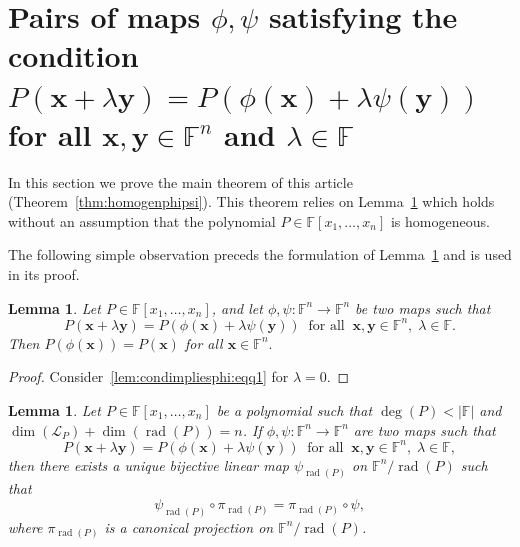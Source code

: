\documentclass{elsarticle}
\DeclareMathOperator{\rad}{rad}
\def\F{{\mathbb F}}
\newtheorem{lemma}[theorem]{Lemma}
\theoremstyle{definition}
\numberwithin{equation}{section}
\begin{document}
\section{Pairs of maps $\phi, \psi$ satisfying the condition $P(\mathbf{x} + \lambda \mathbf{y}) = P(\phi(\mathbf{x}) + \lambda \psi(\mathbf{y}))$ for all $\mathbf{x},\mathbf{y} \in \mathbb F^n$ and $\lambda \in \F$}
\label{sec:factspres}

%
%
In this section we prove the main theorem of this article (Theorem~\ref{thm:homogenphipsi}). This theorem relies on Lemma~\ref{lem:PPhiPsi} which holds without an assumption that the polynomial $P \in \F[x_1,\ldots, x_n]$ is homogeneous. 

The following simple observation preceds the formulation of Lemma~\ref{lem:PPhiPsi} and is used in its  proof.

\begin{lemma}\label{lem:condimpliesphi}Let $P \in \F[x_1,\ldots, x_n]$, and let $\phi, \psi \colon \F^n \to \F^n$ be two maps such that
\begin{equation}\label{lem:condimpliesphi:eqq1}
P(\mathbf{x} + \lambda \mathbf{y}) = P(\phi(\mathbf{x}) + \lambda \psi(\mathbf{y}))\;\;\mbox{for all}\;\;\mathbf{x},\mathbf{y} \in \mathbb \F^n,\; \lambda \in \F.
\end{equation}
Then $P(\phi(\mathbf x)) = P (\mathbf x)$ for all $\mathbf x \in \F^n.$
\end{lemma}
\begin{proof}Consider~\eqref{lem:condimpliesphi:eqq1} for $\lambda = 0.$
\end{proof}


\begin{lemma}\label{lem:PPhiPsi}Let $P \in \F[x_1,\ldots, x_n]$ be a polynomial such that $\deg (P) < |\F|$ and $\dim (\mathcal L_P) + \dim (\rad(P)) = n$.  If  $\phi, \psi \colon \F^n \to \F^n$ are two maps such that
\begin{equation}\label{lem:PPhiPsi:eqq1}
P(\mathbf{x} + \lambda \mathbf{y}) = P(\phi(\mathbf{x}) + \lambda \psi(\mathbf{y}))\;\;\mbox{for all}\;\;\mathbf{x},\mathbf{y} \in \mathbb \F^n,\; \lambda \in \F,
\end{equation}
then there exists a unique bijective linear map $\psi_{\rad(P)}$ on $\F^n / \rad(P)$ such that 
\begin{equation}\label{lem:PPhiPsi:eq}
\psi_{\rad(P)} \circ \pi_{\rad(P)} = \pi_{\rad(P)} \circ \psi,
\end{equation}
 where $\pi_{\rad(P)}$ is a canonical projection on $\F^n / \rad(P)$.
\end{lemma} 
\end{document}
